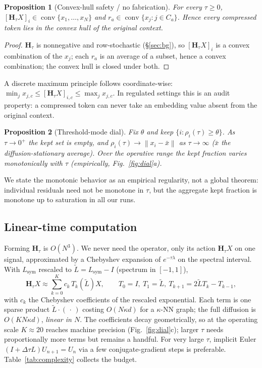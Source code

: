 \documentclass[11pt]{article}
\newtheorem{proposition}{Proposition}
\newcommand{\Hop}{\mathbf{H}}
\newcommand{\norm}[1]{\left\lVert#1\right\rVert}
\newcommand{\conv}{\operatorname{conv}}
\begin{document}
\begin{proposition}[Convex-hull safety / no fabrication]
\label{prop:hull}
For every $\tau\ge 0$, $[\Hop_\tau X]_i\in\conv\{x_1,\dots,x_N\}$ and $r_a\in\conv\{x_j:j\in C_a\}$.
Hence every compressed token lies in the convex hull of the original context.
\end{proposition}
\begin{proof}
$\Hop_\tau$ is nonnegative and row-stochastic (\S\ref{sec:bg}), so $[\Hop_\tau X]_i$ is a convex
combination of the $x_j$; each $r_a$ is an average of a subset, hence a convex combination; the
convex hull is closed under both.
\end{proof}
\noindent
A discrete maximum principle follows coordinate-wise:
$\min_j x_{j,c}\le[\Hop_\tau X]_{i,c}\le\max_j x_{j,c}$. In regulated settings this is an audit
property: a compressed token can never take an embedding value absent from the original context.

\begin{proposition}[Threshold-mode dial]
\label{prop:dial}
Fix $\theta$ and keep $\{i:\rho_i(\tau)\ge\theta\}$. As $\tau\to0^+$ the kept set is empty, and
$\rho_i(\tau)\to\norm{x_i-\bar x}$ as $\tau\to\infty$ ($\bar x$ the diffusion-stationary average).
Over the operative range the kept fraction varies monotonically with $\tau$
(empirically, Fig.~\ref{fig:dial}a).
\end{proposition}
\noindent
We state the monotonic behavior as an empirical regularity, not a global theorem: individual
residuals need not be monotone in $\tau$, but the aggregate kept fraction is monotone up to
saturation in all our runs.

\subsection{Linear-time computation}
\label{sec:fast}
Forming $\Hop_\tau$ is $O(N^3)$. We never need the operator, only its action $\Hop_\tau X$ on one
signal, approximated by a Chebyshev expansion of $e^{-\tau\lambda}$ on the spectral interval. With
$L_{\mathrm{sym}}$ rescaled to $\tilde L=L_{\mathrm{sym}}-I$ (spectrum in $[-1,1]$),
\begin{equation}
\Hop_\tau X\approx\sum_{k=0}^{K}c_k\,T_k(\tilde L)X,\qquad
T_0=I,\ T_1=\tilde L,\ T_{k+1}=2\tilde L T_k-T_{k-1},
\end{equation}
with $c_k$ the Chebyshev coefficients of the rescaled exponential. Each term is one sparse product
$\tilde L\cdot(\,\cdot\,)$ costing $O(N\kappa d)$ for a $\kappa$-NN graph; the full diffusion is
$O(KN\kappa d)$, \emph{linear in $N$}. The coefficients decay geometrically, so at the operating
scale $K\!\approx\!20$ reaches machine precision (Fig.~\ref{fig:dial}c); larger $\tau$ needs
proportionally more terms but remains a handful. For very large $\tau$, implicit Euler
$(I+\Delta\tau L)U_{n+1}=U_n$ via a few conjugate-gradient steps is preferable.
Table~\ref{tab:complexity} collects the budget.
\end{document}
